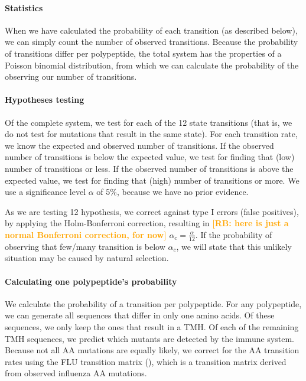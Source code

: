 \documentclass{article}
\newcommand{\richel}[1]{\textcolor{orange}{\textbf{[RB: #1]}}}
\begin{document}
\paragraph{Statistics}

When we have calculated the probability of each transition (as described below),
we can simply count the number of observed transitions.
Because the probability of transitions differ per polypeptide,
the total system has the properties of a Poisson binomial distribution,
from which we can calculate the probability of the observing our
number of transitions.

\paragraph{Hypotheses testing}

Of the complete system, we test for each of the 12 state transitions (that is,
we do not test for mutations that result in the same state).
For each transition rate, we know the expected and observed number
of transitions. If the observed number of transitions is below the expected
value, we test for finding that (low) number of transitions or less.
If the observed number of transitions is above the expected
value, we test for finding that (high) number of transitions or more.
We use a significance level $\alpha$ of 5\%, because we have no prior
evidence. 

As we are testing 12 hypothesis, 
we correct against type I errors (false positives), 
by applying the Holm-Bonferroni correction, 
resulting in \richel{here is just a normal Bonferroni correction, for now}
$\alpha_c = \frac{\alpha}{12}$.
If the probability of observing that few/many 
transition is below $\alpha_c$, we will state 
that this unlikely situation may be caused by natural selection.

\paragraph{Calculating one polypeptide's probability}

We calculate the probability of a transition per polypeptide.
For any polypeptide, we can generate all sequences that differ
in only one amino acids. Of these sequences, we only keep the ones
that result in a TMH. Of each of the remaining TMH sequences, we predict
which mutants are detected by the immune system. Because not all 
AA mutations are equally likely, we correct for the AA transition
rates using the FLU transition matrix (\cite{dang2010flu}),
which is a transition matrix derived from observed influenza AA mutations.
\end{document}
